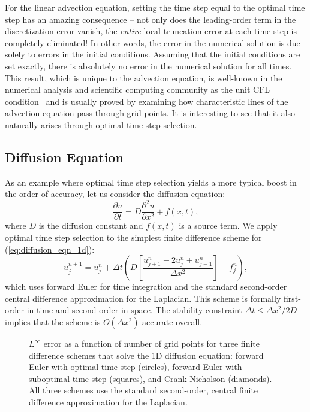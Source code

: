 \documentclass[fleqn,12pt,twoside]{article}
\newcommand{\beq}{\begin{equation}}
\newcommand{\eeq}{\end{equation}}
\def\pt{\partial t}
\def\px{\partial x}
\def\dt{\Delta t}
\def\dx{\Delta x}
\begin{document}
For the linear advection equation, setting the time step equal to the optimal 
time step has an amazing consequence -- not only does the leading-order term
in the discretization error vanish, the \emph{entire} local truncation 
error at each time step is completely eliminated!  In other words, the error 
in the numerical solution is due solely to errors in the initial conditions.
Assuming that the initial conditions are set exactly, there is absolutely no 
error in the numerical solution for all times.
This result, which is unique to the advection equation, is well-known in the 
numerical analysis and scientific computing community as the unit CFL 
condition~\cite{leveque_book_2002} and is usually proved by examining 
how characteristic lines of the advection equation pass through grid points.  
It is interesting to see that it also naturally arises through optimal time 
step selection.


\subsection{Diffusion Equation \label{sec:diffusion_eqn_1d}}
As an example where optimal time step selection yields a more typical boost 
in the order of accuracy, let us consider the diffusion equation:
\beq
  \frac{\partial u}{\pt} = D \frac{\partial^2 u}{\px^2} + f(x,t),
  \label{eq:diffusion_eqn_1d}
\eeq
where $D$ is the diffusion constant and $f(x,t)$ is a source term.  
We apply optimal time step selection to the simplest finite difference 
scheme for (\ref{eq:diffusion_eqn_1d}):
\beq
  u^{n+1}_j = u^{n}_j 
  + \dt 
    \left( D \left[\frac{u^{n}_{j+1} -2 u^{n}_j + u^{n}_{j-1}}{\dx^2}\right] 
         + f^n_j \right),
  \label{eq:diffusion_eqn_1d_FD_scheme}
\eeq
which uses forward Euler for time integration and the standard second-order 
central difference approximation for the Laplacian.
This scheme is formally first-order in time and second-order in space.  
The stability constraint $\dt \le \dx^2/2D$ implies that the scheme is 
$O(\dx^2)$ accurate overall.

\begin{figure}[tb]
\begin{center}
\caption{$L^\infty$ error as a function of number of grid points for three 
finite difference schemes that solve the 1D diffusion equation: forward Euler 
with optimal time step (circles), forward Euler with suboptimal time step
(squares), and Crank-Nicholson (diamonds).  
All three schemes use the standard second-order, central finite difference 
approximation for the Laplacian.  
}
\label{fig:diffusion_eqn_1d_no_src_error}
\end{center}
\end{figure}
\end{document}
